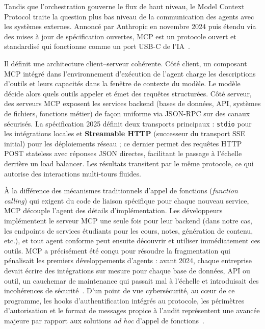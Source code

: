 Tandis que l'orchestration gouverne le flux de haut niveau, le Model Context Protocol
traite la question plus bas niveau de la communication des agents avec les systèmes
externes. Annoncé par Anthropic en novembre 2024 puis étendu via des mises à jour de
spécification ouvertes, MCP est un protocole ouvert et standardisé qui fonctionne
comme un \og{}port USB-C de l'IA\fg{}~\cite{anthropic2024,anthropicmcpdocs}.

Il définit une architecture client--serveur cohérente. Côté client,
un composant MCP intégré dans l'environnement d'exécution de l'agent
charge les descriptions d'outils et leurs capacités dans la fenêtre
de contexte du modèle. Le modèle décide alors quels outils appeler
et émet des requêtes structurées. Côté serveur, des serveurs MCP
exposent les services backend (bases de données, API, systèmes de
fichiers, fonctions métier) de façon uniforme via JSON-RPC sur des
canaux sécurisés. La spécification 2025 définit deux transports
principaux : \texttt{stdio} pour les intégrations locales et
\textbf{Streamable HTTP} (successeur du transport SSE initial) pour
les déploiements réseau ; ce dernier permet des requêtes HTTP POST
stateless avec réponses JSON directes, facilitant le passage à
l'échelle derrière un load balancer. Les résultats transitent par
le même protocole, ce qui autorise des interactions multi-tours
fluides.

À la différence des mécanismes traditionnels d'appel de fonctions
(\emph{function calling}) qui exigent du code de liaison spécifique pour
chaque nouveau service, MCP découple l'agent des
détails d'implémentation. Les développeurs implémentent le serveur MCP une seule fois
pour leur backend (dans notre cas, les endpoints de services étudiants pour les cours,
notes, génération de contenu, etc.), et tout agent conforme peut ensuite découvrir et
utiliser immédiatement ces outils. MCP a précisément été conçu pour résoudre la
fragmentation qui pénalisait les premiers développements d'agents : avant 2024, chaque
entreprise devait écrire des intégrations sur mesure pour chaque base de données, API
ou outil, un cauchemar de maintenance qui passait mal à l'échelle et introduisait des
incohérences de sécurité~\cite{anthropic2024,mcpspec}. D'un point de vue
cybersécurité, au cœur de ce programme, les hooks d'authentification intégrés au
protocole, les périmètres d'autorisation et le format de messages propice à l'audit
représentent une avancée majeure par rapport aux solutions \emph{ad hoc}
d'appel de fonctions~\cite{mcpsecurity}.

